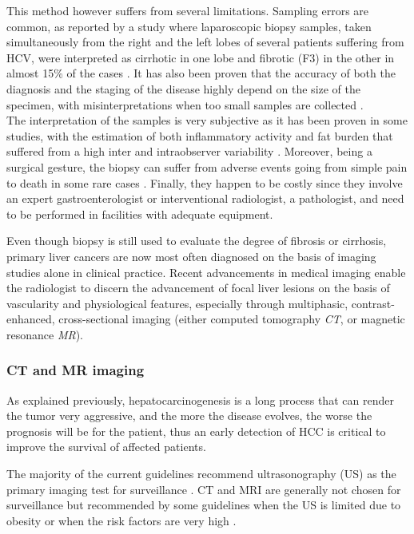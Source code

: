 This method however suffers from several limitations. Sampling errors
are common, as reported by a study where laparoscopic biopsy samples,
taken simultaneously from the right and the left lobes of several
patients suffering from HCV, were interpreted as cirrhotic in one lobe
and fibrotic (F3) in the other in almost 15\% of the cases \cite{Regev2002}. It has also been proven that the
accuracy of both the diagnosis and the staging of the disease highly
depend on the size of the specimen, with misinterpretations when too
small samples are collected \cite{Colloredo2003}.\\
The interpretation of the samples is very subjective as it has been
proven in some studies, with the estimation of both inflammatory
activity and fat burden that suffered from a high inter and
intraobserver variability \cite{Bedossa1994}.
Moreover, being a surgical gesture, the biopsy can suffer from adverse
events going from simple pain to death in some rare cases \cite{Rockey2009, Castera2001, Seeff2010, Piccinino1986}. Finally, they happen to be costly since
they involve an expert gastroenterologist or interventional radiologist, a pathologist,
and need to be performed in facilities with adequate equipment.

Even though biopsy is still used to evaluate the degree of fibrosis or
cirrhosis, primary liver cancers are now most often diagnosed on the
basis of imaging studies alone in clinical practice. Recent advancements
in medical imaging enable the radiologist to discern the advancement of focal
liver lesions on the basis of vascularity and physiological features,
especially through multiphasic, contrast-enhanced, cross-sectional
imaging (either computed tomography \emph{CT}, or magnetic resonance
\emph{MR}).

\subsubsection{CT and MR imaging}\label{ct-and-mr-imaging}

As explained previously, hepatocarcinogenesis is a long process that can
render the tumor very aggressive, and the more the disease evolves, the
worse the prognosis will be for the patient, thus an early detection of
HCC is critical to improve the survival of affected patients.

The majority of the current guidelines recommend ultrasonography (US) as
the primary imaging test for surveillance \cite{Choi2014}. CT and MRI are generally not chosen for surveillance but
recommended by some guidelines when the US is limited due to obesity or
when the risk factors are very high \cite{Omata2010, Llovet2012}.

